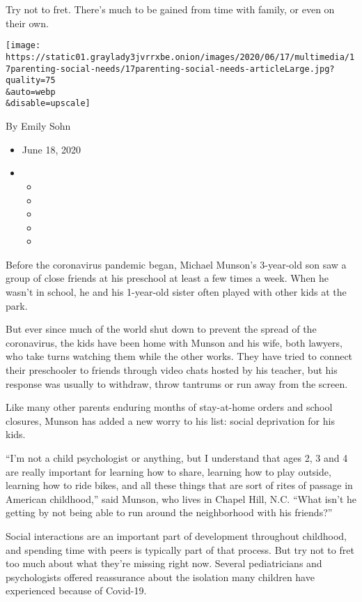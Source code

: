 Try not to fret. There's much to be gained from time with family, or
even on their own.

\texttt{[image: https://static01.graylady3jvrrxbe.onion/images/2020/06/17/multimedia/17parenting-social-needs/17parenting-social-needs-articleLarge.jpg?quality=75\\\&auto=webp\\\&disable=upscale]}

By Emily Sohn

\begin{itemize}
\item
  June 18, 2020
\item
  \begin{itemize}
  \item
  \item
  \item
  \item
  \item
  \end{itemize}
\end{itemize}

Before the coronavirus pandemic began, Michael Munson's 3-year-old son
saw a group of close friends at his preschool at least a few times a
week. When he wasn't in school, he and his 1-year-old sister often
played with other kids at the park.

But ever since much of the world shut down to prevent the spread of the
coronavirus, the kids have been home with Munson and his wife, both
lawyers, who take turns watching them while the other works. They have
tried to connect their preschooler to friends through video chats hosted
by his teacher, but his response was usually to withdraw, throw tantrums
or run away from the screen.

Like many other parents enduring months of stay-at-home orders and
school closures, Munson has added a new worry to his list: social
deprivation for his kids.

``I'm not a child psychologist or anything, but I understand that ages
2, 3 and 4 are really important for learning how to share, learning how
to play outside, learning how to ride bikes, and all these things that
are sort of rites of passage in American childhood,'' said Munson, who
lives in Chapel Hill, N.C. ``What isn't he getting by not being able to
run around the neighborhood with his friends?''

Social interactions are an important part of development throughout
childhood, and spending time with peers is typically part of that
process. But try not to fret too much about what they're missing right
now. Several pediatricians and psychologists offered reassurance about
the isolation many children have experienced because of Covid-19.


